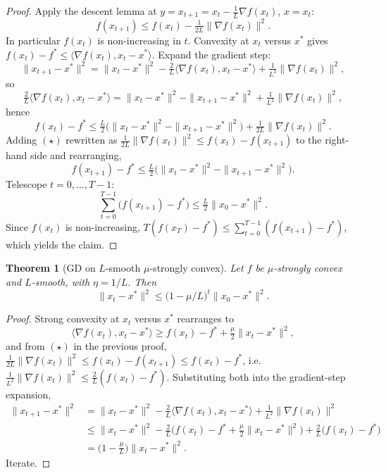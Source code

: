 \documentclass[11pt]{article}
\newtheorem{theorem}{Theorem}[section]
\theoremstyle{remark}
\begin{document}
\begin{proof}
Apply the descent lemma at $y = x_{t+1} = x_t - \tfrac{1}{L}\nabla f(x_t)$, $x = x_t$:
\begin{equation}
f(x_{t+1}) \leq f(x_t) - \tfrac{1}{2L}\|\nabla f(x_t)\|^2. \tag{$\star$}
\end{equation}
In particular $f(x_t)$ is non-increasing in $t$. Convexity at $x_t$ versus $x^*$ gives $f(x_t) - f^* \leq \langle \nabla f(x_t), x_t - x^*\rangle$. Expand the gradient step:
\[
\|x_{t+1} - x^*\|^2 = \|x_t - x^*\|^2 - \tfrac{2}{L}\langle \nabla f(x_t), x_t - x^*\rangle + \tfrac{1}{L^2}\|\nabla f(x_t)\|^2,
\]
so
\[
\tfrac{2}{L}\langle \nabla f(x_t), x_t - x^*\rangle = \|x_t - x^*\|^2 - \|x_{t+1} - x^*\|^2 + \tfrac{1}{L^2}\|\nabla f(x_t)\|^2,
\]
hence
\[
f(x_t) - f^* \leq \tfrac{L}{2}\bigl(\|x_t - x^*\|^2 - \|x_{t+1} - x^*\|^2\bigr) + \tfrac{1}{2L}\|\nabla f(x_t)\|^2.
\]
Adding $(\star)$ rewritten as $\tfrac{1}{2L}\|\nabla f(x_t)\|^2 \leq f(x_t) - f(x_{t+1})$ to the right-hand side and rearranging,
\[
f(x_{t+1}) - f^* \leq \tfrac{L}{2}\bigl(\|x_t - x^*\|^2 - \|x_{t+1} - x^*\|^2\bigr).
\]
Telescope $t = 0, \ldots, T-1$:
\[
\sum_{t=0}^{T-1} \bigl(f(x_{t+1}) - f^*\bigr) \leq \tfrac{L}{2}\|x_0 - x^*\|^2.
\]
Since $f(x_t)$ is non-increasing, $T (f(x_T) - f^*) \leq \sum_{t=0}^{T-1}(f(x_{t+1}) - f^*)$, which yields the claim.
\end{proof}

\begin{theorem}[GD on $L$-smooth $\mu$-strongly convex]
Let $f$ be $\mu$-strongly convex and $L$-smooth, with $\eta = 1/L$. Then
\[
\|x_t - x^*\|^2 \leq \bigl(1 - \mu/L\bigr)^t \|x_0 - x^*\|^2.
\]
\end{theorem}

\begin{proof}
Strong convexity at $x_t$ versus $x^*$ rearranges to
\[
\langle \nabla f(x_t), x_t - x^*\rangle \geq f(x_t) - f^* + \tfrac{\mu}{2}\|x_t - x^*\|^2,
\]
and from $(\star)$ in the previous proof, $\tfrac{1}{2L}\|\nabla f(x_t)\|^2 \leq f(x_t) - f(x_{t+1}) \leq f(x_t) - f^*$, i.e. $\tfrac{1}{L^2}\|\nabla f(x_t)\|^2 \leq \tfrac{2}{L}(f(x_t) - f^*)$. Substituting both into the gradient-step expansion,
\begin{align*}
\|x_{t+1} - x^*\|^2 &= \|x_t - x^*\|^2 - \tfrac{2}{L}\langle \nabla f(x_t), x_t - x^*\rangle + \tfrac{1}{L^2}\|\nabla f(x_t)\|^2 \\
&\leq \|x_t - x^*\|^2 - \tfrac{2}{L}\bigl(f(x_t) - f^* + \tfrac{\mu}{2}\|x_t - x^*\|^2\bigr) + \tfrac{2}{L}\bigl(f(x_t) - f^*\bigr) \\
&= \bigl(1 - \tfrac{\mu}{L}\bigr)\|x_t - x^*\|^2.
\end{align*}
Iterate.
\end{proof}
\end{document}
